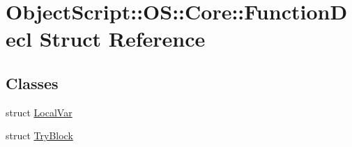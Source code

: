 \hypertarget{struct_object_script_1_1_o_s_1_1_core_1_1_function_decl}{}\section{Object\+Script\+:\+:OS\+:\+:Core\+:\+:Function\+Decl Struct Reference}
\label{struct_object_script_1_1_o_s_1_1_core_1_1_function_decl}
\subsection*{Classes}
\begin{DoxyCompactItemize}
\item 
struct \hyperlink{struct_object_script_1_1_o_s_1_1_core_1_1_function_decl_1_1_local_var}{Local\+Var}
\item 
struct \hyperlink{struct_object_script_1_1_o_s_1_1_core_1_1_function_decl_1_1_try_block}{Try\+Block}
\end{DoxyCompactItemize}
